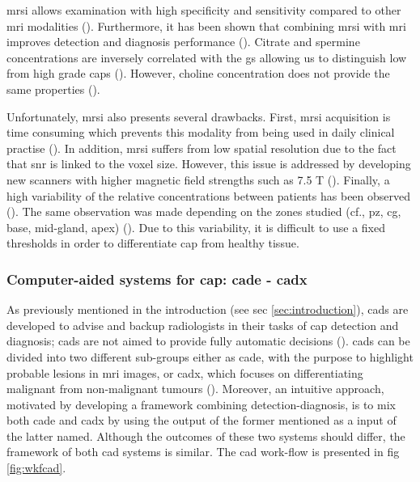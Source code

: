 \begin{enumerate}[leftmargin=*]

\ac{mrsi} allows examination with high specificity and sensitivity compared to other \ac{mri} modalities (\cite{Choi2007}). Furthermore, it has been shown that combining \ac{mrsi} with \ac{mri} improves detection and diagnosis performance (\cite{Scheidler1999a,Kaji1998,Vilanova2009}). Citrate and spermine concentrations are inversely correlated with the \ac{gs} allowing us to distinguish low from high grade \acp{cap} (\cite{Giskeodegard2013}). However, choline concentration does not provide the same properties (\cite{Giskeodegard2013}).

Unfortunately, \ac{mrsi} also presents several drawbacks. First, \ac{mrsi} acquisition is time consuming which prevents this modality from being used in daily clinical practise (\cite{Barentsz2012}). In addition, \ac{mrsi} suffers from low spatial resolution due to the fact that \ac{snr} is linked to the voxel size. However, this issue is addressed by developing new scanners with higher magnetic field strengths such as 7.5 T (\cite{Giskeodegard2013}). Finally, a high variability of the relative concentrations between patients has been observed (\cite{Choi2007}). The same observation was made depending on the zones studied (cf., \ac{pz}, \ac{cg}, base, mid-gland, apex) (\cite{Walker2010,Lemaitre2011}). Due to this variability, it is difficult to use a fixed thresholds in order to differentiate \ac{cap} from healthy tissue.

\end{enumerate}

\subsubsection{Computer-aided systems for \ac{cap}: \ac{cade} - \ac{cadx}} \label{subsubsec:CAD}

As previously mentioned in the introduction (see \acs{sec} \ref{sec:introduction}), \acp{cad} are developed to advise and backup radiologists in their tasks of \ac{cap} detection and diagnosis; \acp{cad} are not aimed to provide fully automatic decisions (\cite{Giger2008}). \acp{cad} can be divided into two different sub-groups either as \ac{cade}, with the purpose to highlight probable lesions in \ac{mri} images, or \ac{cadx}, which focuses on differentiating malignant from non-malignant tumours (\cite{Giger2008}). Moreover, an intuitive approach, motivated by developing a framework combining detection-diagnosis, is to mix both \ac{cade} and \ac{cadx} by using the output of the former mentioned as a input of the latter named. Although the outcomes of these two systems should differ, the framework of both \ac{cad} systems is similar. The \ac{cad} work-flow is presented in \acs{fig} \ref{fig:wkfcad}.

